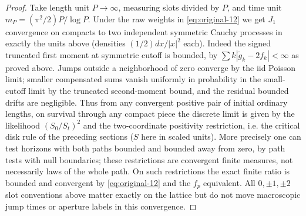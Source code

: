 \begin{proof}
Take length unit \(P\to\infty\), measuring slots divided by \(P\), and time unit \(m_P=(\pi^2/2)P/\log P\).
Under the raw weights in \eqref{eq:original-12} we get \(J_1\) convergence on compacts to two independent symmetric Cauchy processes in exactly the units above (densities \((1/2)dx/|x|^2\) each).
Indeed the signed truncated first moment at symmetric cutoff is bounded, by \(\sum k|\widetilde g_k-2f_k|<\infty\) as proved above.
Jumps outside a neighborhood of zero converge by the iid Poisson limit; smaller compensated sums vanish uniformly in probability in the small-cutoff limit by the truncated second-moment bound, and the residual bounded drifts are negligible.
Thus from any convergent positive pair of initial ordinary lengths, on survival through any compact piece the discrete limit is given by the likelihood \((S_0/S_t)^2\) and the two-coordinate positivity restriction, i.e. the critical disk rule of the preceding sections (\(S\) here in scaled units).
More precisely one can test horizons with both paths bounded and bounded away from zero, by path tests with null boundaries; these restrictions are convergent finite measures, not necessarily laws of the whole path.
On such restrictions the exact finite ratio is bounded and convergent by \eqref{eq:original-12} and the \(f_p\) equivalent.
All \(0,\pm1,\pm2\) slot conventions above matter exactly on the lattice but do not move macroscopic jump times or aperture labels in this convergence.


\end{proof}
